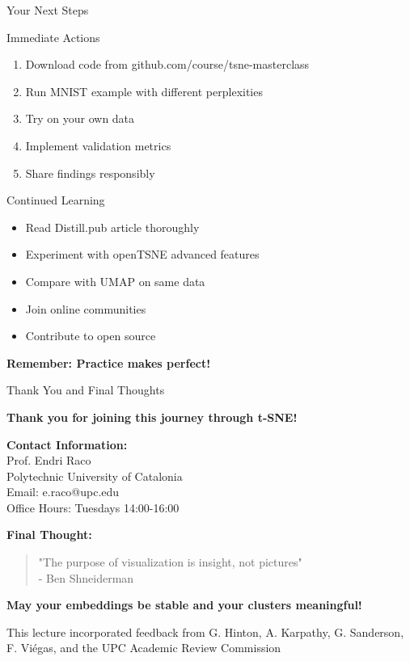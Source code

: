 \documentclass[aspectratio=169]{beamer}
\begin{document}
\begin{frame}{Your Next Steps}
\begin{block}{Immediate Actions}
\begin{enumerate}
\item Download code from github.com/course/tsne-masterclass
\item Run MNIST example with different perplexities
\item Try on your own data
\item Implement validation metrics
\item Share findings responsibly
\end{enumerate}
\end{block}

\begin{block}{Continued Learning}
\begin{itemize}
\item Read Distill.pub article thoroughly
\item Experiment with openTSNE advanced features
\item Compare with UMAP on same data
\item Join online communities
\item Contribute to open source
\end{itemize}
\end{block}

\colorbox{green!30}{\textbf{Remember: Practice makes perfect!}}
\end{frame}

\begin{frame}{Thank You and Final Thoughts}
\begin{center}
\Large\textbf{Thank you for joining this journey through t-SNE!}
\end{center}

\vspace{0.5cm}
\textbf{Contact Information:}\\
Prof. Endri Raco\\
Polytechnic University of Catalonia\\
Email: e.raco@upc.edu\\
Office Hours: Tuesdays 14:00-16:00

\vspace{0.5cm}
\textbf{Final Thought:}
\begin{quote}
"The purpose of visualization is insight, not pictures"\\
\hfill - Ben Shneiderman
\end{quote}

\vspace{0.5cm}
\begin{center}
\colorbox{blue!30}{\textbf{May your embeddings be stable and your clusters meaningful!}}
\end{center}

\small
This lecture incorporated feedback from G. Hinton, A. Karpathy, G. Sanderson,\\
F. Viégas, and the UPC Academic Review Commission
\end{frame}
\end{document}
